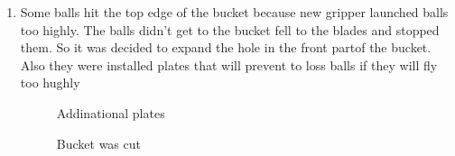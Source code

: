 \begin{enumerate}
	\item Some balls hit the top edge of the bucket because new gripper launched balls too highly. The balls didn't get to the bucket fell to the blades and stopped them. So it was decided to expand the hole in the front partof the bucket. Also they were installed plates that will prevent to loss balls if they will fly too hughly 
	\begin{figure}[H]
		\begin{minipage}[h]{0.47\linewidth}
			\caption{Addinational plates}
		\end{minipage}
		\hfill
		\begin{minipage}[h]{0.47\linewidth}
			\caption{Bucket was cut}
		\end{minipage}
	\end{figure}
	

\end{enumerate}
